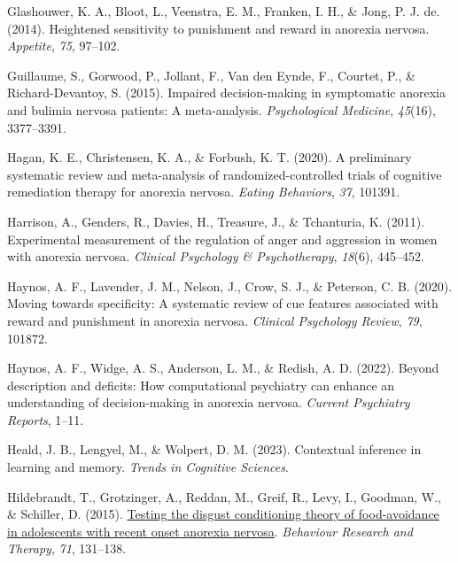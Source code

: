 \documentclass[
  man,floatsintext]{apa6}
\newlength{\cslhangindent}
\newlength{\cslentryspacingunit} %
\newenvironment{CSLReferences}[2] %
 {%
  \setlength{\parindent}{0pt}
  \ifodd #1
  \let\oldpar\par
  \def\par{\hangindent=\cslhangindent\oldpar}
  \fi
  \setlength{\parskip}{#2\cslentryspacingunit}
 }%
 {}
\begin{document}
\begin{CSLReferences}{1}{0}
\leavevmode{}%
Glashouwer, K. A., Bloot, L., Veenstra, E. M., Franken, I. H., \& Jong, P. J. de. (2014). Heightened sensitivity to punishment and reward in anorexia nervosa. \emph{Appetite}, \emph{75}, 97--102.

\leavevmode{}%
Guillaume, S., Gorwood, P., Jollant, F., Van den Eynde, F., Courtet, P., \& Richard-Devantoy, S. (2015). Impaired decision-making in symptomatic anorexia and bulimia nervosa patients: A meta-analysis. \emph{Psychological Medicine}, \emph{45}(16), 3377--3391.

\leavevmode{}%
Hagan, K. E., Christensen, K. A., \& Forbush, K. T. (2020). A preliminary systematic review and meta-analysis of randomized-controlled trials of cognitive remediation therapy for anorexia nervosa. \emph{Eating Behaviors}, \emph{37}, 101391.

\leavevmode{}%
Harrison, A., Genders, R., Davies, H., Treasure, J., \& Tchanturia, K. (2011). Experimental measurement of the regulation of anger and aggression in women with anorexia nervosa. \emph{Clinical Psychology \& Psychotherapy}, \emph{18}(6), 445--452.

\leavevmode{}%
Haynos, A. F., Lavender, J. M., Nelson, J., Crow, S. J., \& Peterson, C. B. (2020). Moving towards specificity: A systematic review of cue features associated with reward and punishment in anorexia nervosa. \emph{Clinical Psychology Review}, \emph{79}, 101872.

\leavevmode{}%
Haynos, A. F., Widge, A. S., Anderson, L. M., \& Redish, A. D. (2022). Beyond description and deficits: How computational psychiatry can enhance an understanding of decision-making in anorexia nervosa. \emph{Current Psychiatry Reports}, 1--11.

\leavevmode{}%
Heald, J. B., Lengyel, M., \& Wolpert, D. M. (2023). Contextual inference in learning and memory. \emph{Trends in Cognitive Sciences}.

\leavevmode{}%
Hildebrandt, T., Grotzinger, A., Reddan, M., Greif, R., Levy, I., Goodman, W., \& Schiller, D. (2015). \href{https://www.ncbi.nlm.nih.gov/pubmed/26131915}{{Testing the disgust conditioning theory of food-avoidance in adolescents with recent onset anorexia nervosa}}. \emph{Behaviour Research and Therapy}, \emph{71}, 131--138.


\end{CSLReferences}
\end{document}
